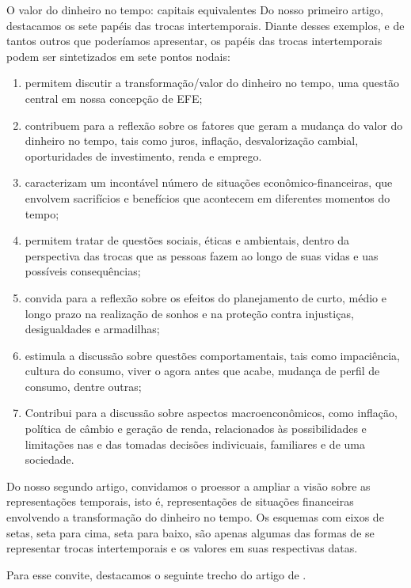 \begin{paginatexto}{O valor do dinheiro no tempo: capitais equivalentes}
Do nosso primeiro artigo, destacamos os sete papéis das trocas intertemporais. Diante desses exemplos, e de tantos outros que poderíamos apresentar, os papéis das trocas intertemporais podem ser sintetizados em sete pontos nodais:
\begin{enumerate}
  \item permitem discutir a transformação/valor do dinheiro no tempo, uma questão central em nossa concepção de EFE;
  \item contribuem para a reflexão sobre os fatores que geram a mudança do valor do dinheiro no tempo, tais como juros, inflação, desvalorização cambial, oporturidades de investimento, renda e emprego.
  \item caracterizam um incontável número de situações econômico-financeiras, que envolvem sacrifícios e benefícios que acontecem em diferentes momentos do tempo;
  \item permitem tratar de questões sociais, éticas e ambientais, dentro da perspectiva das trocas que as pessoas fazem ao longo de suas vidas e uas possíveis consequências;
  \item convida para a reflexão sobre os efeitos do planejamento de curto, médio e longo prazo na realização de sonhos e na proteção contra injustiças, desigualdades e armadilhas;
  \item estimula a discussão sobre questões comportamentais, tais como impaciência, cultura do consumo, viver o agora antes que acabe, mudança de perfil de consumo, dentre outras;
  \item Contribui para a discussão sobre aspectos macroenconômicos, como inflação, política de câmbio e geração de renda, relacionados às possibilidades e limitações nas e das tomadas decisões indivicuais, familiares e de uma sociedade.
\end{enumerate}
  Do nosso segundo artigo, convidamos o proessor a ampliar a visão sobre as representações temporais, isto é, representações de situações financeiras envolvendo a transformação do dinheiro no tempo. Os esquemas com eixos de setas, seta para cima, seta para baixo, são apenas algumas das formas de se representar trocas intertemporais e os valores em suas respectivas datas.

  Para esse convite, destacamos o seguinte trecho do artigo de \cite[p. 125]{muniz2016b}.


\end{paginatexto}
